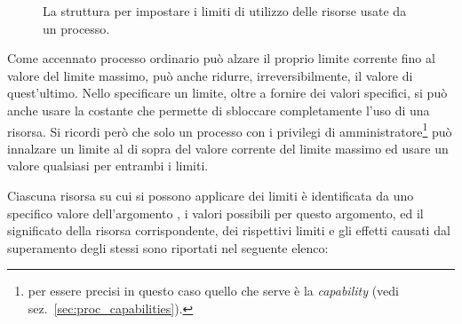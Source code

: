 \begin{figure}[!htb]
  \footnotesize
  \centering
  \begin{minipage}[c]{0.8\textwidth}
  \end{minipage} 
  \normalsize 
  \caption{La struttura  per impostare i limiti di utilizzo 
    delle risorse usate da un processo.}
  \label{fig:sys_rlimit_struct}
\end{figure}

Come accennato processo ordinario può alzare il proprio limite corrente fino
al valore del limite massimo, può anche ridurre, irreversibilmente, il valore
di quest'ultimo.  Nello specificare un limite, oltre a fornire dei valori
specifici, si può anche usare la costante  che permette
di sbloccare completamente l'uso di una risorsa. Si ricordi però che solo un
processo con i privilegi di amministratore\footnote{per essere precisi in
  questo caso quello che serve è la \textit{capability}
   (vedi sez.~\ref{sec:proc_capabilities}).} può
innalzare un limite al di sopra del valore corrente del limite massimo ed
usare un valore qualsiasi per entrambi i limiti.

Ciascuna risorsa su cui si possono applicare dei limiti è identificata da uno
specifico valore dell'argomento , i valori possibili per
questo argomento, ed il significato della risorsa corrispondente, dei
rispettivi limiti e gli effetti causati dal superamento degli stessi sono
riportati nel seguente elenco:

